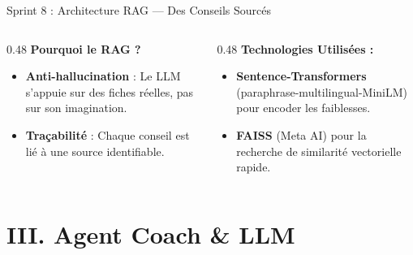\documentclass[10pt,aspectratio=169]{beamer}
\begin{document}
\begin{frame}{Sprint 8 : Architecture RAG --- Des Conseils Sourcés}
    \vspace{0.4cm}
    \begin{columns}[T]
        \begin{column}{0.48\textwidth}
            \textbf{Pourquoi le RAG ?}
            \begin{itemize} \scriptsize
                \item \textbf{Anti-hallucination} : Le LLM s'appuie sur des fiches réelles, pas sur son imagination.
                \item \textbf{Traçabilité} : Chaque conseil est lié à une source identifiable.
            \end{itemize}
        \end{column}
        \begin{column}{0.48\textwidth}
            \textbf{Technologies Utilisées :}
            \begin{itemize} \scriptsize
                \item \textbf{Sentence-Transformers} (paraphrase-multilingual-MiniLM) pour encoder les faiblesses.
                \item \textbf{FAISS} (Meta AI) pour la recherche de similarité vectorielle rapide.
            \end{itemize}
        \end{column}
    \end{columns}
\end{frame}

\section{III. Agent Coach \& LLM}
\end{document}
